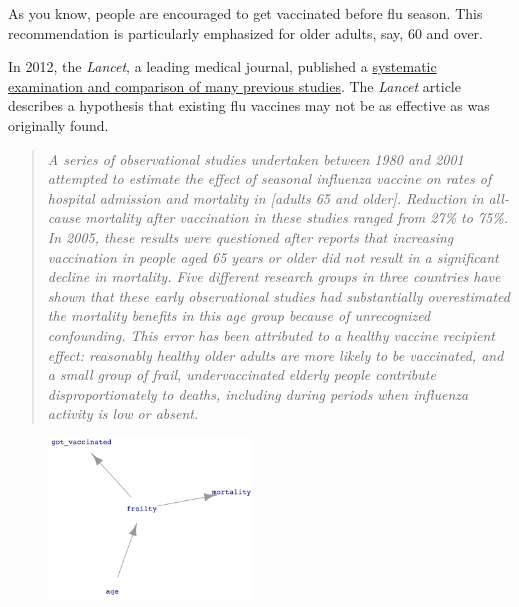 \documentclass[
  letterpaper,
  DIV=11,
  numbers=noendperiod,
  oneside]{scrreprt}
\begin{document}
\begin{tcolorbox}[enhanced jigsaw, colbacktitle=quarto-callout-note-color!10!white, breakable, opacitybacktitle=0.6, colback=white, left=2mm, arc=.35mm, colframe=quarto-callout-note-color-frame, coltitle=black, toprule=.15mm, opacityback=0, leftrule=.75mm, bottomtitle=1mm, toptitle=1mm, titlerule=0mm, title=\textcolor{quarto-callout-note-color}{\faInfo}\hspace{0.5em}{Example: The flu vaccine}, rightrule=.15mm, bottomrule=.15mm]

As you know, people are encouraged to get vaccinated before flu season.
This recommendation is particularly emphasized for older adults, say, 60
and over.

In 2012, the \emph{Lancet}, a leading medical journal, published a
\href{https://www.thelancet.com/journals/laninf/article/PIIS1473-3099(11)70295-X/fulltext}{systematic
examination and comparison of many previous studies}.
{} The \emph{Lancet}
article describes a hypothesis that existing flu vaccines may not be as
effective as was originally found.

\begin{quote}
\emph{A series of observational studies undertaken between 1980 and 2001
attempted to estimate the effect of seasonal influenza vaccine on rates
of hospital admission and mortality in {[}adults 65 and older{]}.
Reduction in all-cause mortality after vaccination in these studies
ranged from 27\% to 75\%. In 2005, these results were questioned after
reports that increasing vaccination in people aged 65 years or older did
not result in a significant decline in mortality. Five different
research groups in three countries have shown that these early
observational studies had substantially overestimated the mortality
benefits in this age group because of unrecognized confounding. This
error has been attributed to a healthy vaccine recipient effect:
reasonably healthy older adults are more likely to be vaccinated, and a
small group of frail, undervaccinated elderly people contribute
disproportionately to deaths, including during periods when influenza
activity is low or absent.}
\end{quote}

\begin{figure}[H]

{\centering \includegraphics[width=2.12in,height=\textheight]{./www/healthy-vaccine-dag.png}

}
\end{figure}
\end{tcolorbox}
\end{document}

